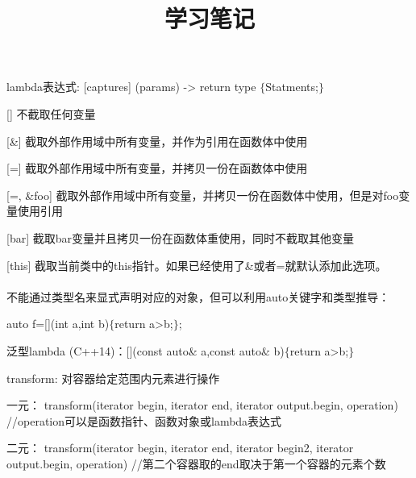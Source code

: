 \documentclass[cn,hazy,blue,screen,14pt]{note}
\title{学习笔记}
\author{}
\date{\zhtoday}
\begin{document}
\maketitle
\newpage
\tableofcontents
\newpage

\noindent lambda表达式: [captures] (params) -> return type $\{$Statments;$\}$


[] 不截取任何变量

[\&] 截取外部作用域中所有变量，并作为引用在函数体中使用

[=] 截取外部作用域中所有变量，并拷贝一份在函数体中使用

[=, \&foo] 截取外部作用域中所有变量，并拷贝一份在函数体中使用，但是对foo变量使用引用

[bar] 截取bar变量并且拷贝一份在函数体重使用，同时不截取其他变量

[this] 截取当前类中的this指针。如果已经使用了\&或者=就默认添加此选项。
\\\\
不能通过类型名来显式声明对应的对象，但可以利用auto关键字和类型推导：

auto f=[](int a,int b)$\{$return a>b;$\}$;


泛型lambda (C++14)：[](const auto\& a,const auto\& b)$\{$return a>b;$\}$

\newpage

\noindent transform: 对容器给定范围内元素进行操作

一元： transform(iterator begin, iterator end, iterator output.begin, operation) //operation可以是函数指针、函数对象或lambda表达式

二元： transform(iterator begin, iterator end, iterator begin2, iterator output.begin, operation) //第二个容器取的end取决于第一个容器的元素个数
\end{document}
